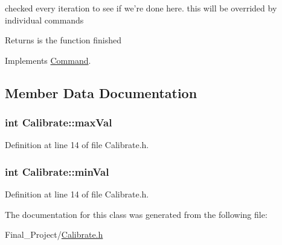 checked every iteration to see if we're done here. this will be overrided by individual commands 

\begin{DoxyReturn}{Returns}
is the function finished 
\end{DoxyReturn}


Implements \hyperlink{classCommand_a9aa704d5f9d98f510a79e645701dc72a}{Command}.



\subsection{Member Data Documentation}
\hypertarget{classCalibrate_a48cdb0fd93fef77a7eab3fc629e9d2a6}{
\subsubsection[{max\-Val}]{\setlength{\rightskip}{0pt plus 5cm}int Calibrate\-::max\-Val\hspace{0.3cm}{\ttfamily [private]}}}\label{classCalibrate_a48cdb0fd93fef77a7eab3fc629e9d2a6}


Definition at line 14 of file Calibrate.\-h.

\hypertarget{classCalibrate_a76f63e45bd236101217c023f5b4c00d0}{
\subsubsection[{min\-Val}]{\setlength{\rightskip}{0pt plus 5cm}int Calibrate\-::min\-Val\hspace{0.3cm}{\ttfamily [private]}}}\label{classCalibrate_a76f63e45bd236101217c023f5b4c00d0}


Definition at line 14 of file Calibrate.\-h.



The documentation for this class was generated from the following file\-:\begin{DoxyCompactItemize}
\item 
Final\-\_\-\-Project/\hyperlink{Calibrate_8h}{Calibrate.\-h}\end{DoxyCompactItemize}
